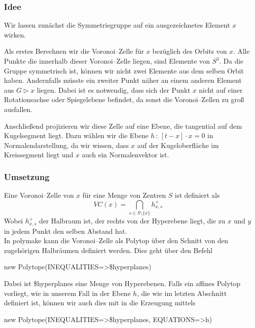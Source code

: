         \subsubsection*{Idee}
            Wir lassen zunächst die Symmetriegruppe auf ein ausgezeichnetes Element $x$ wirken.

            \noindent Als erstes Berechnen wir die Voronoi--Zelle für $x$ bezüglich des Orbits von $x$. Alle Punkte die innerhalb dieser Voronoi--Zelle liegen, sind Elemente von $S^3$. 
            Da die Gruppe symmetrisch ist, können wir nicht zwei Elemente aus dem selben Orbit haben. 
            Andernfalls müsste ein zweiter Punkt näher an einem anderen Element aus $G \rhd x$ liegen.
            Dabei ist es notwendig, dass sich der Punkt $x$ nicht auf einer Rotationsachse oder Spiegelebene befindet, da sonst die Voronoi--Zellen zu groß ausfallen.
            
            Anschließend projizieren wir diese Zelle auf eine Ebene, die tangential auf dem Kugelsegment liegt. Dazu wählen wir die Ebene $h \, : \, [t - x] \cdot x = 0$ in Normalendarstellung, da wir wissen, dass $x$ auf der Kugeloberfläche im Kreissegment liegt und $x$ auch ein Normalenvektor ist.
            
        \subsubsection*{Umsetzung}
         Eine Voronoi--Zelle von $x$ für eine Menge von Zentren $S$ ist definiert als 
         $$ VC(x) = \bigcap_{s \in S \setminus \{ x \}} h^+_{x,s}$$
         Wobei $h^+_{x,s}$ der Halbraum ist, der rechts von der Hyperebene liegt, die zu $x$ und $y$ in jedem Punkt den selben Abstand hat.\\
         
         \noindent In polymake kann die Voronoi--Zelle als Polytop über den Schnitt von den zugehörigen Halbräumen definiert werden. Dies geht über den Befehl

         \begin{code}
            new Polytope(INEQUALITIES=>\$hyperplanes)
         \end{code}

         Dabei ist \$hyperplanes eine Menge von Hyperebenen. Falls ein affines Polytop vorliegt, wie in unserem Fall in der Ebene $h$, die wie im letzten Abschnitt
         definiert ist, können wir auch dies mit in die Erzeugung mittels

         \begin{code}
new Polytope(INEQUALITIES=>\$hyperplanes, EQUATIONS=>{h})
         \end{code}

